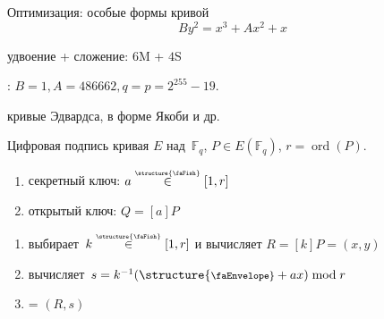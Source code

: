 \documentclass{beamer}
\begin{document}
	\begin{frame}{Оптимизация: особые формы кривой}
		\[
		B y^2 = x^3 + A x^2 + x
		\]
		\begin{center}
			\begin{tcolorbox}[enhanced,hbox,colback=box-blue-color!15,colframe=box-blue-color,title=Сложность,center title]
				\begin{varwidth}{\textwidth}
					удвоение + сложение: $6$M + $4$S
				\end{varwidth}
			\end{tcolorbox}	
		\end{center}
		: $B = 1, A = 486662, q=p=2^{255} - 19$.
		
		\vspace{0.5em}
		
		 кривые Эдвардса, в форме Якоби и др.
	\end{frame}
	
	\begin{frame}{Цифровая подпись}
		 кривая $E$ над~$\mathbb{F}_q$, $P \in E(\mathbb{F}_q)$, $r = \operatorname{ord}(P)$.
		
		
		\vspace{1em}
		
		
		\begin{enumerate}
			\item секретный ключ: $a \overset{\text{\tiny\structure{\faFish}}}{\in} [1, r]$
			\item открытый ключ: $Q = [a] P$
		\end{enumerate}
		
		\vspace{1em}
		
		\begin{enumerate}
			\item \structure{\faCat} выбирает~$k \overset{\text{\tiny\structure{\faFish}}}{\in} [1, r]$ и вычисляет $R = [k] P  = (x, y)$
			\item вычисляет~$s = k^{-1} (\text{\structure{\footnotesize\faEnvelope}} + a x) \bmod{r}$
			\item \structure{\faPaw} = $(R, s)$
		\end{enumerate}
	\end{frame}
	
\end{document}
